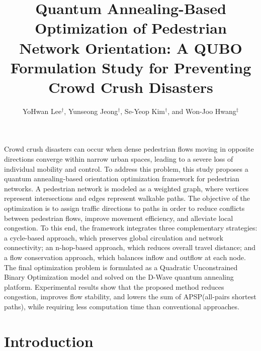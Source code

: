 \documentclass[twocolumn,a4paper]{article} %
\begin{document}
\title{Quantum Annealing-Based Optimization of
Pedestrian Network Orientation:
A QUBO Formulation Study for Preventing Crowd
Crush Disasters}
\author{YoHwan Lee${}^\dag$, Yunseong Jeong${}^\dag$, Se-Yeop Kim${}^\dag$, and Won-Joo Hwang${}^\ddag$}
\address{\dag School of Computer Science and Engineering, Pusan National University \\
\ddag Department of Information Convergence Engineering, Pusan National University \\
Busan 46241, Republic of Korea \\
Email: , , , }
\maketitle

\abstract
Crowd crush disasters can occur when dense pedestrian flows moving in opposite directions converge within narrow urban spaces, leading to a severe loss of individual mobility and control. To address this
problem, this study proposes a quantum annealing-based orientation
optimization framework for pedestrian networks. A pedestrian network
is modeled as a weighted graph, where vertices represent intersections
and edges represent walkable paths. The objective of the optimization is to assign traffic directions to paths in order to reduce conflicts
between pedestrian flows, improve movement efficiency, and alleviate
local congestion. To this end, the framework integrates three complementary strategies: a cycle-based approach, which preserves global circulation and network connectivity; an n-hop-based approach, which reduces overall travel distance; and a flow conservation approach, which
balances inflow and outflow at each node. The final optimization problem is formulated as a Quadratic Unconstrained Binary Optimization
model and solved on the D-Wave quantum annealing platform. Experimental results show that the proposed method reduces congestion,
improves flow stability, and lowers the sum of APSP(all-pairs shortest paths), while requiring less computation time than conventional
approaches.

\endabstract
\section{Introduction} \label{sec:intro}
\end{document}
